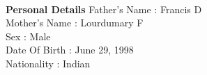 \documentclass{article}
\begin{document}
\Large \textbf{\\Personal Details}
\Large \hspace{20pt}Father’s Name	:  \Large Francis D \\ 
\hspace*{140pt}\Large Mother’s Name	:  \Large Lourdumary F \\ 
\hspace*{140pt}\Large Sex :  \Large Male \\ 
\hspace*{140pt}\Large Date Of Birth	:  \Large June 29, 1998 \\ 
\hspace*{140pt}\Large Nationality :  \Large Indian \\ 
\end{document}
